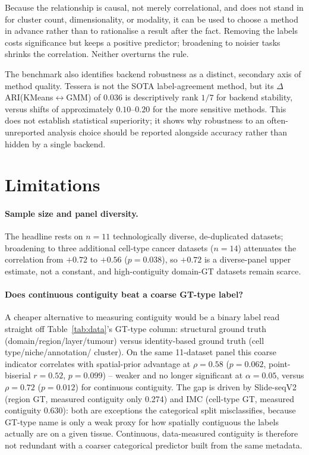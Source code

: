 \documentclass[journal]{IEEEtran}
\begin{document}
Because the relationship is causal, not merely correlational, and does not stand in for cluster count,
dimensionality, or modality, it can be used to choose a method in advance rather than to rationalise a
result after the fact. Removing the labels costs significance but keeps a positive predictor; broadening to
noisier tasks shrinks the correlation. Neither overturns the rule.

The benchmark also identifies backend robustness as a distinct, secondary axis of method quality. Tessera
is not the SOTA label-agreement method, but its $\Delta$ARI(KMeans$\leftrightarrow$GMM) of $0.036$ is
descriptively rank $1/7$ for backend stability, versus shifts of approximately $0.10$--$0.20$ for the
more sensitive methods. This does not establish statistical superiority; it shows why robustness to an
often-unreported analysis choice should be reported alongside accuracy rather than hidden by a single
backend.

\section{Limitations}\label{sec:limitations}
\paragraph{Sample size and panel diversity.} The headline rests on $n{=}11$ technologically diverse,
de-duplicated datasets; broadening to three additional cell-type cancer datasets ($n{=}14$) attenuates the
correlation from $+0.72$ to $+0.56$ ($p=0.038$), so $+0.72$ is a diverse-panel upper estimate, not a
constant, and high-contiguity domain-GT datasets remain scarce.

\paragraph{Does continuous contiguity beat a coarse GT-type label?} A cheaper alternative to measuring
contiguity would be a binary label read straight off Table~\ref{tab:data}'s GT-type column: structural
ground truth (domain/region/layer/tumour) versus identity-based ground truth (cell type/niche/annotation/
cluster). On the same 11-dataset panel this coarse indicator correlates with spatial-prior advantage at
$\rho{=}0.58$ ($p=0.062$, point-biserial $r=0.52$, $p=0.099$) -- weaker and no longer significant at
$\alpha{=}0.05$, versus $\rho{=}0.72$ ($p=0.012$) for continuous contiguity. The gap is driven by
Slide-seqV2 (region GT, measured contiguity only 0.274) and IMC (cell-type GT, measured contiguity 0.630):
both are exceptions the categorical split misclassifies, because GT-type name is only a weak proxy for how
spatially contiguous the labels actually are on a given tissue. Continuous, data-measured contiguity is
therefore not redundant with a coarser categorical predictor built from the same metadata.
\end{document}
